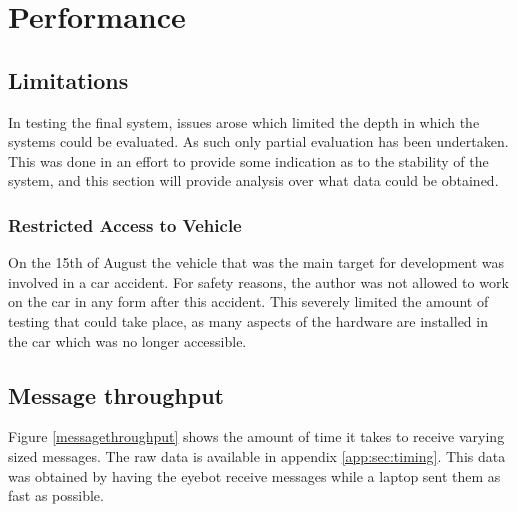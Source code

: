 
\chapter{Performance} %



\ifpdf
    \graphicspath{{7/figures/PNG/}{7/figures/PDF/}{7/figures/}}
\else
    \graphicspath{{7/figures/EPS/}{7/figures/}}
\fi




\section{Limitations}

In testing the final system, issues arose which limited the depth in which the systems could be evaluated. As such only partial evaluation has been undertaken. This was done in an effort to provide some indication as to the stability of the system, and this section will provide analysis over what data could be obtained.

\subsection{Restricted Access to Vehicle}
\label{sec:access}
On the 15th of August the vehicle that was the main target for development was involved in a car accident. For safety reasons, the author was not allowed to work on the car in any form after this accident. This severely limited the amount of testing that could take place, as many aspects of the hardware are installed in the car which was no longer accessible.

\section{Message throughput}

Figure \ref{messagethroughput} shows the amount of time it takes to receive varying sized messages. The raw data is available in appendix \ref{app:sec:timing}. This data was obtained by having the eyebot receive messages while a laptop sent them as fast as possible. 



